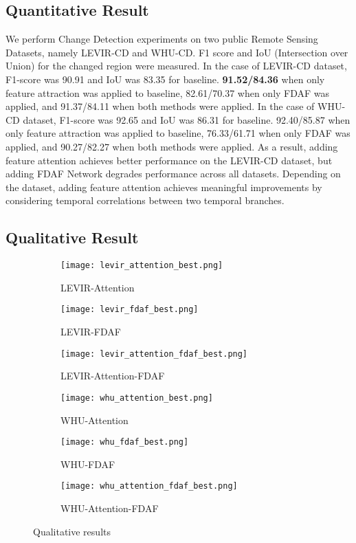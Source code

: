 \documentclass[../main.tex]{subfiles}
\begin{document}
\subsection{Quantitative Result}
We perform Change Detection experiments on two public Remote Sensing Datasets, namely LEVIR-CD\cite{LEVIR-CD} and WHU-CD\cite{WHU-CD}. F1 score and IoU (Intersection over Union) for the changed region were measured. In the case of LEVIR-CD dataset, F1-score was 90.91 and IoU was 83.35 for baseline. \textbf{91.52/84.36} when only feature attraction was applied to baseline, 82.61/70.37 when only FDAF was applied, and 91.37/84.11 when both methods were applied. In the case of WHU-CD dataset, F1-score was 92.65 and IoU was 86.31 for baseline. 92.40/85.87 when only feature attraction was applied to baseline, 76.33/61.71 when only FDAF was applied, and 90.27/82.27 when both methods were applied.
As a result, adding feature attention achieves better performance on the LEVIR-CD dataset, but  adding FDAF Network degrades performance across all datasets. Depending on the dataset, adding feature attention achieves meaningful improvements by considering temporal correlations between two temporal branches.




\subsection{Qualitative Result}
\begin{figure}[h]
    \centering
    \begin{subfigure}[b]{0.3\linewidth}
        \texttt{[image: levir\_attention\_best.png]}
        \caption{LEVIR-Attention}
    \end{subfigure}
    \begin{subfigure}[b]{0.3\linewidth}
        \texttt{[image: levir\_fdaf\_best.png]}
        \caption{LEVIR-FDAF}
    \end{subfigure}
    \begin{subfigure}[b]{0.3\linewidth}
        \texttt{[image: levir\_attention\_fdaf\_best.png]}
        \caption{LEVIR-Attention-FDAF}
    \end{subfigure}
    \begin{subfigure}[b]{0.3\linewidth}
        \texttt{[image: whu\_attention\_best.png]}
        \caption{WHU-Attention}
    \end{subfigure}
    \begin{subfigure}[b]{0.3\linewidth}
        \texttt{[image: whu\_fdaf\_best.png]}
        \caption{WHU-FDAF}
    \end{subfigure}
    \begin{subfigure}[b]{0.3\linewidth}
        \texttt{[image: whu\_attention\_fdaf\_best.png]}
        \caption{WHU-Attention-FDAF}
    \end{subfigure}
    \caption{Qualitative results}
    \label{fig:qualitative_results}
\end{figure}
\end{document}

